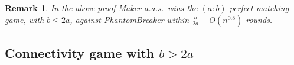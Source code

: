 \documentclass[11pt, a4paper]{article}
\numberwithin{equation}{section}
\numberwithin{figure}{section}
\newtheorem{remark}[theorem]{Remark}
\begin{document}
\begin{remark}\label{remark:pm}
In the above proof
Maker a.a.s.~wins the $(a:b)$ perfect matching game,
with $b\leq 2a$,
against PhantomBreaker within $\frac{n}{2a} + O(n^{0.8})$
rounds.
\end{remark}







\bigskip



\subsection{Connectivity game with $b > 2a$}
\end{document}
